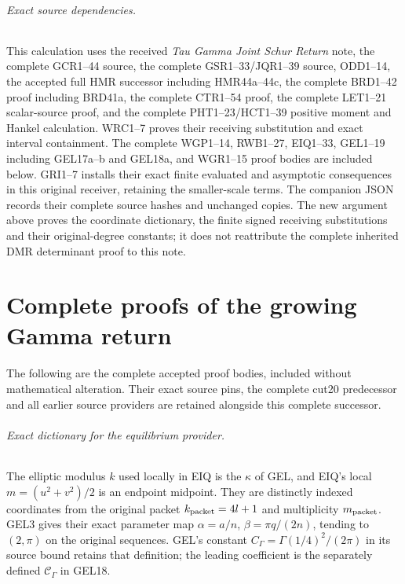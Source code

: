 \documentclass[11pt,a4paper]{article}
\begin{document}
\paragraph{Exact source dependencies.}
This calculation uses the received \emph{Tau Gamma Joint
Schur Return} note, the complete GCR1--44 source, the complete
GSR1--33/JQR1--39 source, ODD1--14, the accepted full
HMR successor including HMR44a--44c, the complete BRD1--42
proof including BRD41a, the complete CTR1--54 proof,
the complete LET1--21 scalar-source proof, and the complete
PHT1--23/HCT1--39 positive moment and Hankel calculation.
WRC1--7 proves their receiving substitution and exact interval
containment. The complete WGP1--14, RWB1--27, EIQ1--33,
GEL1--19 including GEL17a--b and GEL18a, and WGR1--15
proof bodies are included below. GRI1--7 installs their exact
finite evaluated and asymptotic consequences in this original
receiver, retaining the smaller-scale terms. The companion JSON
records their complete source hashes and unchanged copies.
The new argument above proves the coordinate dictionary,
the finite signed receiving substitutions and their
original-degree constants; it does not reattribute the
complete inherited DMR determinant proof to this note.

\clearpage
\part*{Complete proofs of the growing Gamma return}
The following are the complete accepted proof bodies, included without
mathematical alteration. Their exact source pins, the complete cut20
predecessor and all earlier source providers are retained alongside
this complete successor.


\paragraph{Exact dictionary for the equilibrium provider.}
The elliptic modulus $k$ used locally in EIQ is the $\kappa$ of GEL,
and EIQ's local $m=(u^2+v^2)/2$ is an endpoint midpoint. They are
distinctly indexed coordinates from the original packet
$k_{\rm packet}=4l+1$ and multiplicity $m_{\rm packet}$.
GEL3 gives their exact parameter map
$\alpha=a/n$, $\beta=\pi q/(2n)$, tending to $(2,\pi)$ on
the original sequences. GEL's constant $C_\Gamma=\Gamma(1/4)^2/(2\pi)$
in its source bound retains that definition; the leading coefficient
is the separately defined $\mathcal C_\Gamma$ in GEL18.



\end{document}
